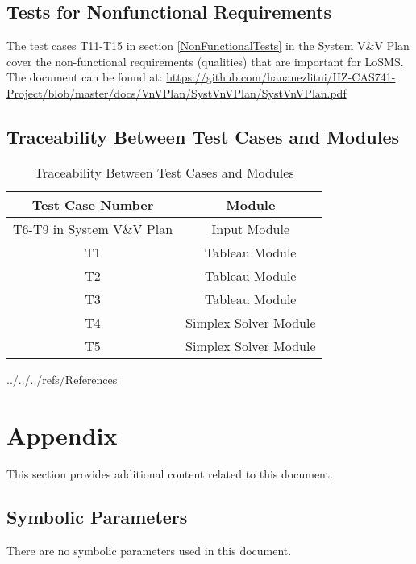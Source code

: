 \documentclass[12pt, titlepage]{article}
\newcommand{\famname}{LoSMS}
\begin{document}
\subsection{Tests for Nonfunctional Requirements}

The test cases T11-T15 in section \ref{NonFunctionalTests} in the System V\&V 
Plan cover the non-functional requirements (qualities) that are important for 
\famname{}. The document can be found at: 
\url{https://github.com/hananezlitni/HZ-CAS741-Project/blob/master/docs/VnVPlan/SystVnVPlan/SystVnVPlan.pdf}

\subsection{Traceability Between Test Cases and Modules}

\begin{table} [h!]
	\centering
	\begin{tabular}{|c|c|}
		\hline	
		\textbf{Test Case Number} & \textbf{Module}\\
		\hline 
		T6-T9 in System V\&V Plan& Input Module\\ \hline
		T1& Tableau Module\\ \hline
		T2& Tableau Module\\ \hline
		T3& Tableau Module\\ \hline
		T4& Simplex Solver Module\\ \hline
		T5& Simplex Solver Module\\ \hline
	\end{tabular}
	\caption{Traceability Between Test Cases and Modules}
	\label{Table:Traceability} 
\end{table}

\newpage


 {../../../refs/References}

\newpage

\section{Appendix}

This section provides additional content related to this document.

\subsection{Symbolic Parameters}

There are no symbolic parameters used in this document.
\end{document}
